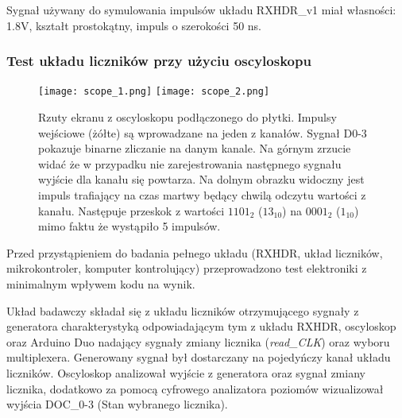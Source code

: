 Sygnał używany do symulowania impulsów układu RXHDR\_v1 miał własności: 1.8V, kształt prostokątny, impuls o szerokości 50 ns.


\subsubsection{Test układu liczników przy użyciu oscyloskopu}

\begin{figure}
        \texttt{[image: scope\_1.png]}
        \texttt{[image: scope\_2.png]}
        \caption{Rzuty ekranu z oscyloskopu podłączonego do płytki. 
        Impulsy wejściowe (żółte) są wprowadzane na jeden z kanałów. 
        Sygnał D0-3 pokazuje binarne zliczanie na danym kanale. 
        Na górnym zrzucie widać że w przypadku nie zarejestrowania następnego sygnału wyjście dla kanału się powtarza. 
        Na dolnym obrazku widoczny jest impuls trafiający na czas martwy będący chwilą odczytu wartości z kanału.
        Następuje przeskok z wartości $1101_{2}$ ($13_{10}$) na $0001_{2}$ ($1_{10}$) mimo faktu że wystąpiło 5 impulsów.
        }
        \label{Oscyloskop}
\end{figure}

Przed przystąpieniem do badania pełnego układu (RXHDR, układ liczników, mikrokontroler, komputer kontrolujący) przeprowadzono test elektroniki z minimalnym wpływem kodu na wynik. 

Układ badawczy składał się z układu liczników  otrzymującego sygnały z generatora charakterystyką odpowiadającym tym z układu RXHDR, oscyloskop oraz Arduino Duo nadający sygnały zmiany licznika (\textit{read\_CLK}) oraz wyboru multiplexera. Generowany sygnał był dostarczany na pojedyńczy kanał układu liczników. 
Oscyloskop analizował wyjście z generatora oraz sygnał zmiany licznika, dodatkowo za pomocą cyfrowego analizatora poziomów wizualizował wyjścia DOC\_0-3 (Stan wybranego licznika).

